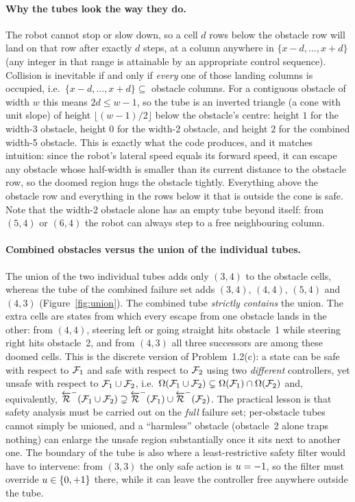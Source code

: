 \paragraph{Why the tubes look the way they do.}
The robot cannot stop or slow down, so a cell $d$ rows below the obstacle row will land on that row
after exactly $d$ steps, at a column anywhere in $\{x-d,\dots,x+d\}$ (any integer in that range is
attainable by an appropriate control sequence). Collision is inevitable if and only if
\emph{every} one of those landing columns is occupied, i.e.\ $\{x-d,\dots,x+d\}\subseteq$ obstacle
columns. For a contiguous obstacle of width $w$ this means $2d\le w-1$, so the tube is an inverted
triangle (a cone with unit slope) of height $\lfloor (w-1)/2\rfloor$ below the obstacle's centre:
height $1$ for the width-3 obstacle, height $0$ for the width-2 obstacle, and height $2$ for the
combined width-5 obstacle. This is exactly what the code produces, and it matches intuition: since
the robot's lateral speed equals its forward speed, it can escape any obstacle whose half-width is
smaller than its current distance to the obstacle row, so the doomed region hugs the obstacle
tightly. Everything above the obstacle row and everything in the rows below it that is outside the
cone is safe. Note that the width-2 obstacle alone has an empty tube beyond itself: from $(5,4)$ or
$(6,4)$ the robot can always step to a free neighbouring column.

\paragraph{Combined obstacles versus the union of the individual tubes.}
The union of the two individual tubes adds only $(3,4)$ to the obstacle cells, whereas the tube of
the combined failure set adds $(3,4)$, $(4,4)$, $(5,4)$ and $(4,3)$ (Figure~\ref{fig:union}). The
combined tube \emph{strictly contains} the union. The extra cells are states from which every escape
from one obstacle lands in the other: from $(4,4)$, steering left or going straight hits obstacle~1
while steering right hits obstacle~2, and from $(4,3)$ all three successors are among these doomed
cells. This is the discrete version of Problem~1.2(c): a state can be safe with respect to
${\mathcal{F}}_1$ and safe with respect to ${\mathcal{F}}_2$ using two \emph{different} controllers, yet unsafe
with respect to ${\mathcal{F}}_1\cup{\mathcal{F}}_2$, i.e.\
${\Omega}({\mathcal{F}}_1\cup{\mathcal{F}}_2)\subsetneq{\Omega}({\mathcal{F}}_1)\cap{\Omega}({\mathcal{F}}_2)$ and,
equivalently, ${\overleftarrow{{\mathcal{R}}}}^-({\mathcal{F}}_1\cup{\mathcal{F}}_2)\supsetneq
{\overleftarrow{{\mathcal{R}}}}^-({\mathcal{F}}_1)\cup{\overleftarrow{{\mathcal{R}}}}^-({\mathcal{F}}_2)$. The
practical lesson is that safety analysis must be carried out on the \emph{full} failure set;
per-obstacle tubes cannot simply be unioned, and a ``harmless'' obstacle (obstacle~2 alone traps
nothing) can enlarge the unsafe region substantially once it sits next to another one. The boundary
of the tube is also where a least-restrictive safety filter would have to intervene: from $(3,3)$
the only safe action is ${u}=-1$, so the filter must override ${u}\in\{0,+1\}$ there, while it
can leave the controller free anywhere outside the tube.

